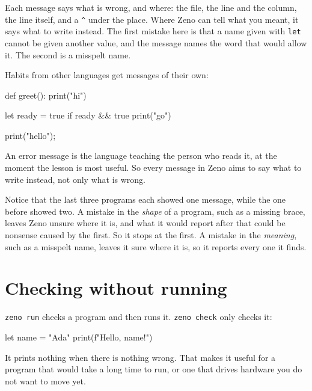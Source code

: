 Each message says what is wrong, and where: the file, the line and the
column, the line itself, and a \verb|^| under the place. Where Zeno can
tell what you meant, it says what to write instead. The first mistake
here is that a name given with \verb|let| cannot be given another
value, and the message names the word that would allow it. The second
is a misspelt name.

Habits from other languages get messages of their own:

\begin{zeno}[fails=yes]
def greet():
    print("hi")
\end{zeno}

\begin{zeno}[fails=yes]
let ready = true
if ready && true {
    print("go")
}
\end{zeno}

\begin{zeno}[fails=yes]
print("hello");
\end{zeno}

\begin{why}
An error message is the language teaching the person who reads it,
at the moment the lesson is most useful. So every message in Zeno
aims to say what to write instead, not only what is wrong.
\end{why}

Notice that the last three programs each showed one message, while the
one before showed two. A mistake in the \emph{shape} of a program,
such as a missing brace, leaves Zeno unsure where it is, and what it
would report after that could be nonsense caused by the first. So it
stops at the first. A mistake in the \emph{meaning}, such as a
misspelt name, leaves it sure where it is, so it reports every one it
finds.

\section{Checking without running}

\verb|zeno run| checks a program and then runs it. \verb|zeno check|
only checks it:

\begin{zeno}[file=greet.zeno, cmd=zeno check greet.zeno]
let name = "Ada"
print(f"Hello, {name}!")
\end{zeno}

It prints nothing when there is nothing wrong. That makes it useful
for a program that would take a long time to run, or one that drives
hardware you do not want to move yet.

